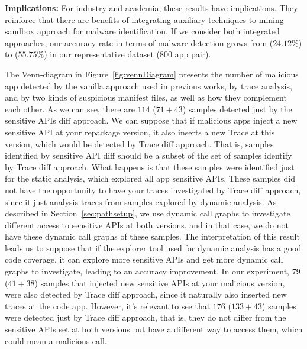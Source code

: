 \textbf{Implications: }For industry and academia, these results have implications. They reinforce that there are benefits of integrating auxiliary techniques to mining sandbox approach for malware identification. 
 If we consider both integrated approaches, our accuracy rate in terms of malware detection grows from ($24.12\%$) to ($55.75\%$) in our representative dataset ($800$ app pair). %

The Venn-diagram in Figure~\ref{fig:vennDiagram} presents the number of malicious app detected by the vanilla approach used in previous works, by trace analysis, and by two kinds of suspicious manifest files, as well as how they complement each other. As we can see, there are $114$ ($71+43$) samples detected just by the sensitive APIs diff approach. We can suppose that if malicious apps inject a new sensitive API at your repackage version, it also inserts a new Trace at this version, which would be detected by Trace diff approach. That is, samples identified by sensitive API diff should be a subset of the set of samples identify by Trace diff approach. What happens is that these samples were identified just for the static analysis, which explored all app sensitive APIs. These samples did not have the opportunity to have your traces investigated by Trace diff approach, since it just analysis traces from samples explored by dynamic analysis. As described in Section~\ref{sec:pathsetup}, we use dynamic call graphs to investigate different access to sensitive APIs at both versions, and in that case, we do not have these dynamic call graphs of these samples. The interpretation of this result leads us to suppose that if the explorer tool used for dynamic analysis has a good code coverage, it can explore more sensitive APIs and get more dynamic call graphs to investigate, leading to an accuracy improvement. In our experiment, $79$ ($41+38$) samples that injected new sensitive APIs at your malicious version, were also detected by Trace diff approach, since it naturally also inserted new traces at the code app. However, it's relevant to see that $176$ ($133+43$) samples were detected just by Trace diff approach, that is, they do not differ from the sensitive APIs set at both versions but have a different way to access them, which could mean a malicious call.


